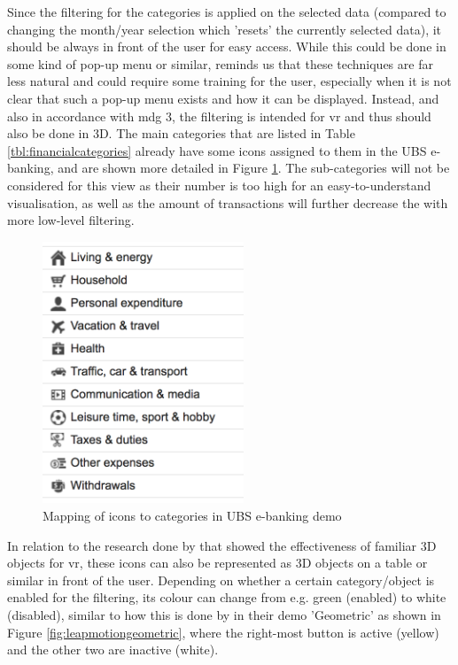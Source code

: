 Since the filtering for the categories is applied on the selected data (compared to changing the month/year selection which 'resets' the currently selected data), it should be always in front of the user for easy access. While this could be done in some kind of pop-up menu or similar, \cite{Bowman2002} reminds us that these techniques are far less natural and could require some training for the user, especially when it is not clear that such a pop-up menu exists and how it can be displayed. Instead, and also in accordance with \gls{mdg} 3, the filtering is intended for \gls{vr} and thus should also be done in 3D. The main categories that are listed in Table \ref{tbl:financialcategories} already have some icons assigned to them in the UBS e-banking, and are shown more detailed in Figure \ref{fig:categoriesicons}. The sub-categories will not be considered for this view as their number is too high for an easy-to-understand visualisation, as well as the amount of transactions will further decrease the with more low-level filtering.
\begin{figure}[b]
	\begin{center}
		\includegraphics[width=6cm]{03_Figures/07_Suggestion/UBSAG2016_CategoriesIcons.png}
		\caption[Mapping of icons to categories in UBS e-banking demo]{Mapping of icons to categories in UBS e-banking demo \citep{UBSAG2016}}
		\label{fig:categoriesicons}
	\end{center}
\end{figure} \newline
In relation to the research done by \cite{Jamieson2007} that showed the effectiveness of familiar 3D objects for \gls{vr}, these icons can also be represented as 3D objects on a table or similar in front of the user. Depending on whether a certain category/object is enabled for the filtering, its colour can change from e.g. green (enabled) to white (disabled), similar to how this is done by \cite{LeapMotion2016} in their demo 'Geometric' as shown in Figure \ref{fig:leapmotiongeometric}, where the right-most button is active (yellow) and the other two are inactive (white).
